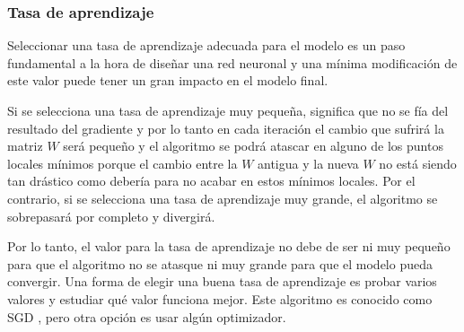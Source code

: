 \subsubsection{Tasa de aprendizaje}\label{learningrate}
Seleccionar una tasa de aprendizaje adecuada para el modelo es un paso fundamental a la hora de diseñar una red neuronal y una mínima modificación de este valor puede tener un gran impacto en el modelo final. 
\newline

Si se selecciona una tasa de aprendizaje muy pequeña, significa que no se fía del resultado del gradiente y por lo tanto en cada iteración el cambio que sufrirá la matriz $W$ será pequeño y el algoritmo se podrá atascar en alguno de los puntos locales mínimos porque el cambio entre la $W$ antigua y la nueva $W$ no está siendo tan drástico como debería para no acabar en estos mínimos locales. Por el contrario, si se selecciona una tasa de aprendizaje muy grande, el algoritmo se sobrepasará por completo y divergirá.
\newline

Por lo tanto, el valor para la tasa de aprendizaje no debe de ser ni muy pequeño para que el algoritmo no se atasque ni muy grande para que el modelo pueda convergir. Una forma de elegir una buena tasa de aprendizaje es probar varios valores y estudiar qué valor funciona mejor. Este algoritmo es conocido como SGD \cite{kiefer}, pero otra opción es usar algún optimizador.
\newline